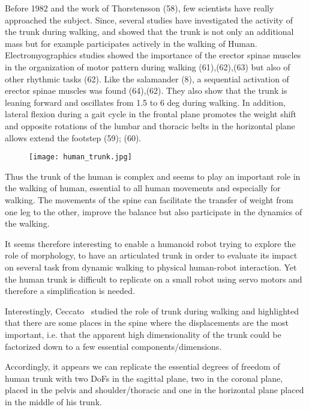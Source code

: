 Before 1982 and the work of Thorstensson (58), few scientists have really approached the subject. Since, several studies have investigated the activity of the trunk during walking, and showed that the trunk is not only an additional mass but for example participates actively in the walking of Human.
Electromyographics studies showed the importance of the erector spinae muscles in the organization of motor pattern during walking (61),(62),(63) but also of other rhythmic tasks (62). Like the salamander (8), a sequential activation of erector spinae muscles was found (64),(62).
They also show that the trunk is leaning forward and oscillates from 1.5 to 6 deg during walking. In addition, lateral flexion during a gait cycle in the frontal plane promotes the weight shift and opposite rotations of the lumbar and thoracic belts in the horizontal plane allows extend the footstep (59); (60).

\begin{figure}[ht]
    \begin{center}
        \texttt{[image: human\_trunk.jpg]}
    \end{center}
    \caption{}
    \label{fig:human_spine_system}
\end{figure}

Thus the trunk of the human is complex and seems to play an important role in the walking of human, essential to all human movements and especially for walking. The movements of the spine can facilitate the transfer of weight from one leg to the other, improve the balance but also participate in the dynamics of the walking.

It seems therefore interesting to enable a humanoid robot trying to explore the role of morphology, to have an articulated trunk in order to evaluate its impact on several task from dynamic walking to physical human-robot interaction. Yet the human trunk is difficult to replicate on a small robot using servo motors and therefore a simplification is needed.

Interestingly, Ceccato~\parencite{ceccatoPlos09} studied the role of trunk during walking and highlighted that there are some places in the spine where the displacements are the most important, i.e. that the apparent high dimensionality of the trunk could be factorized down to a few essential components/dimensions.

Accordingly, it appears we can replicate the essential degrees of freedom of human trunk with two DoFs in the sagittal plane, two in the coronal plane, placed in the pelvis and shoulder/thoracic and one in the horizontal plane placed in the middle of his trunk.

